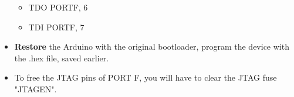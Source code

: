\begin{itemize}
\begin{itemize}
		\item TDO \space\space{} \space\space\space\space\space\space\space\space\space\space\space\space\space\space\space\space\space PORTF, 6
		\item TDI \space\space\space{} \space\space\space\space\space\space\space\space\space\space\space\space\space\space\space\space\space PORTF, 7
	\end{itemize}
	\item \textbf{Restore} the Arduino with the original bootloader, program the device with the .hex file, saved earlier.
	\item To free the JTAG pins of PORT F, you will have to clear the JTAG
	fuse "JTAGEN".
\end{itemize}

